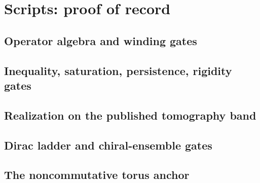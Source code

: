 \documentclass[11pt]{article}
\theoremstyle{definition}
\theoremstyle{plain}
\begin{document}
\section{Scripts: proof of record}

\subsection{Operator algebra and winding gates}


\subsection{Inequality, saturation, persistence, rigidity gates}


\subsection{Realization on the published tomography band}


\subsection{Dirac ladder and chiral-ensemble gates}


\subsection{The noncommutative torus anchor}

\end{document}
